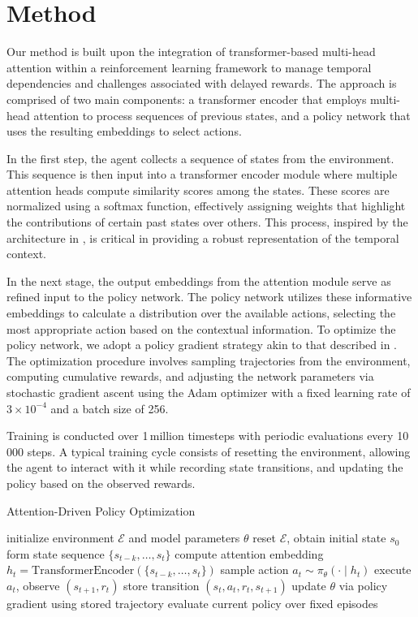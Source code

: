 \documentclass{article}
\begin{document}
\section{Method}
Our method is built upon the integration of transformer-based multi-head attention within a reinforcement learning framework to manage temporal dependencies and challenges associated with delayed rewards. The approach is comprised of two main components: a transformer encoder that employs multi-head attention to process sequences of previous states, and a policy network that uses the resulting embeddings to select actions.

In the first step, the agent collects a sequence of states from the environment. This sequence is then input into a transformer encoder module where multiple attention heads compute similarity scores among the states. These scores are normalized using a softmax function, effectively assigning weights that highlight the contributions of certain past states over others. This process, inspired by the architecture in \cite{ashish_2017_attention}, is critical in providing a robust representation of the temporal context.

In the next stage, the output embeddings from the attention module serve as refined input to the policy network. The policy network utilizes these informative embeddings to calculate a distribution over the available actions, selecting the most appropriate action based on the contextual information. To optimize the policy network, we adopt a policy gradient strategy akin to that described in . The optimization procedure involves sampling trajectories from the environment, computing cumulative rewards, and adjusting the network parameters via stochastic gradient ascent using the Adam optimizer with a fixed learning rate of $3\times10^{-4}$ and a batch size of 256.

Training is conducted over 1\,million timesteps with periodic evaluations every 10\,000 steps. A typical training cycle consists of resetting the environment, allowing the agent to interact with it while recording state transitions, and updating the policy based on the observed rewards.

\begin{algorithm}[H]
\caption{Attention-Driven Policy Optimization}
\begin{algorithmic}[1]
    \State initialize environment $\mathcal{E}$ and model parameters $\theta$
        \State reset $\mathcal{E}$, obtain initial state $s_{0}$
            \State form state sequence $\{s_{t-k},\ldots,s_{t}\}$
            \State compute attention embedding $h_{t}=\mathrm{TransformerEncoder}(\{s_{t-k},\ldots,s_{t}\})$
            \State sample action $a_{t}\sim\pi_{\theta}(\cdot\mid h_{t})$
            \State execute $a_{t}$, observe $(s_{t+1},r_{t})$
            \State store transition $(s_{t},a_{t},r_{t},s_{t+1})$
        \EndWhile
        \State update $\theta$ via policy gradient using stored trajectory
            \State evaluate current policy over fixed episodes
        \EndIf
    \EndFor
\end{algorithmic}
\end{algorithm}
\end{document}
